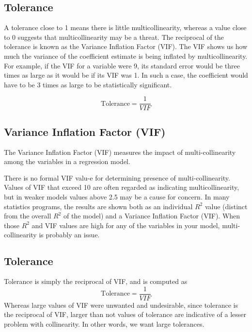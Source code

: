 \documentclass[]{report}
\begin{document}

\subsection{Tolerance}
A tolerance close to 1 means there is little multicollinearity, whereas a value close to 0 suggests that multicollinearity may be a threat. The reciprocal of the tolerance is known as the Variance Inflation Factor (VIF). The VIF shows us how much the variance of the coefficient estimate is being inflated by multicollinearity. For example, if the VIF for a variable were 9, its standard error would be three times as large as it would be if its VIF was 1. In such a case, the coefficient would have to be 3 times as large to be statistically significant.

\[ \mbox{Tolerance} = \frac{1}{VIF}\]

\subsection{Variance Inflation Factor (VIF)}



The Variance Inflation Factor (VIF) measures the impact of multi-collinearity among the variables in a regression model. 
     
There is no formal VIF valu-e for determining presence of multi-collinearity. Values of VIF that exceed 10 are often regarded as indicating multicollinearity, but in weaker models values above 2.5 may be a cause for concern. In many statistics programs, the results are shown both as an individual $R^2$ value (distinct from the overall $R^2$ of the model) and a Variance Inflation Factor (VIF). When those $R^2$ and VIF values are high for any of the variables in your model, multi-collinearity is probably an issue. 

     

\subsection{Tolerance}

Tolerance is simply the reciprocal of VIF, and is computed as
\[ \mbox{Tolerance} = \frac{1}{VIF}\]
Whereas large values of VIF were unwanted and undesirable, since tolerance is the reciprocal of VIF, larger than not values of tolerance are indicative of a lesser problem with collinearity. In other words, we want large tolerances.
\end{document}
